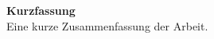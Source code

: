 \vspace*{2cm}
{\bf\Large Kurzfassung} \\ [1em] 
Eine kurze Zusammenfassung der Arbeit.

\cleardoublepage
